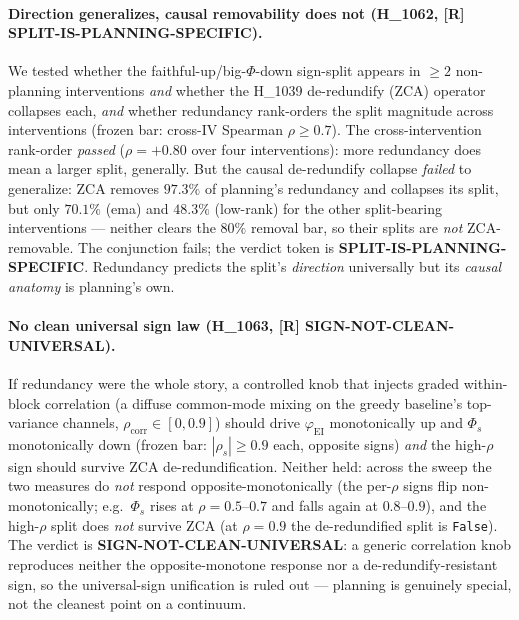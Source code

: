 \documentclass[11pt,a4paper]{article}
\providecommand{\tierRed}{\textcolor{red!70!black}{\textbf{[R]}}}
\newcommand{\faithful}{\ensuremath{\varphi_{\mathrm{EI}}}}
\newcommand{\bigphi}{\ensuremath{\Phi_{s}}}
\begin{document}
\paragraph{Direction generalizes, causal removability does not (H\_1062,
\tierRed{} SPLIT-IS-PLANNING-SPECIFIC).} We tested whether the
faithful-up/big-$\Phi$-down sign-split appears in $\ge 2$ non-planning
interventions \emph{and} whether the H\_1039 de-redundify (ZCA) operator
collapses each, \emph{and} whether redundancy rank-orders the split magnitude
across interventions (frozen bar: cross-IV Spearman $\rho\ge 0.7$). The
cross-intervention rank-order \emph{passed} ($\rho=+0.80$ over four
interventions): more redundancy does mean a larger split, generally. But the
causal de-redundify collapse \emph{failed} to generalize: ZCA removes
$97.3\%$ of planning's redundancy and collapses its split, but only $70.1\%$
(ema) and $48.3\%$ (low-rank) for the other split-bearing interventions ---
neither clears the $80\%$ removal bar, so their splits are \emph{not}
ZCA-removable. The conjunction fails; the verdict token is
\textbf{SPLIT-IS-PLANNING-SPECIFIC}. Redundancy predicts the split's
\emph{direction} universally but its \emph{causal anatomy} is planning's own.

\paragraph{No clean universal sign law (H\_1063, \tierRed{}
SIGN-NOT-CLEAN-UNIVERSAL).} If redundancy were the whole story, a controlled
knob that injects graded within-block correlation (a diffuse common-mode mixing
on the greedy baseline's top-variance channels, $\rho_{\mathrm{corr}}\in[0,0.9]$)
should drive \faithful{} monotonically up and \bigphi{} monotonically down
(frozen bar: $|\rho_s|\ge 0.9$ each, opposite signs) \emph{and} the high-$\rho$
sign should survive ZCA de-redundification. Neither held: across the sweep the
two measures do \emph{not} respond opposite-monotonically (the per-$\rho$ signs
flip non-monotonically; e.g.\ \bigphi{} rises at $\rho=0.5$--$0.7$ and falls
again at $0.8$--$0.9$), and the high-$\rho$ split does \emph{not} survive ZCA
(at $\rho=0.9$ the de-redundified split is \texttt{False}). The verdict is
\textbf{SIGN-NOT-CLEAN-UNIVERSAL}: a generic correlation knob reproduces neither
the opposite-monotone response nor a de-redundify-resistant sign, so the
universal-sign unification is ruled out --- planning is genuinely special, not
the cleanest point on a continuum.
\end{document}
